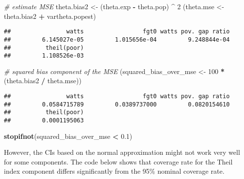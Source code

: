 \documentclass[
]{book}
\newenvironment{Shaded}{\begin{snugshade}}{\end{snugshade}}
\newcommand{\CommentTok}[1]{\textcolor[rgb]{0.56,0.35,0.01}{\textit{#1}}}
\newcommand{\DecValTok}[1]{\textcolor[rgb]{0.00,0.00,0.81}{#1}}
\newcommand{\FloatTok}[1]{\textcolor[rgb]{0.00,0.00,0.81}{#1}}
\newcommand{\FunctionTok}[1]{\textcolor[rgb]{0.13,0.29,0.53}{\textbf{#1}}}
\newcommand{\NormalTok}[1]{#1}
\newcommand{\OtherTok}[1]{\textcolor[rgb]{0.56,0.35,0.01}{#1}}
\newcommand{\SpecialCharTok}[1]{\textcolor[rgb]{0.81,0.36,0.00}{\textbf{#1}}}
\begin{document}
\begin{Shaded}
\begin{Highlighting}[]
\CommentTok{\# estimate MSE}
\NormalTok{theta.bias2 }\OtherTok{\textless{}{-}}\NormalTok{ (theta.exp }\SpecialCharTok{{-}}\NormalTok{ theta.pop) }\SpecialCharTok{\^{}} \DecValTok{2}
\NormalTok{(theta.mse }\OtherTok{\textless{}{-}}\NormalTok{ theta.bias2 }\SpecialCharTok{+}\NormalTok{ vartheta.popest)}
\end{Highlighting}
\end{Shaded}

\begin{verbatim}
##                watts                 fgt0 watts pov. gap ratio 
##         6.145027e-05         1.015656e-04         9.248844e-04 
##          theil(poor) 
##         1.108526e-03
\end{verbatim}

\begin{Shaded}
\begin{Highlighting}[]
\CommentTok{\# squared bias component of the MSE}
\NormalTok{(squared\_bias\_over\_mse }\OtherTok{\textless{}{-}} \DecValTok{100} \SpecialCharTok{*}\NormalTok{ (theta.bias2 }\SpecialCharTok{/}\NormalTok{ theta.mse))}
\end{Highlighting}
\end{Shaded}

\begin{verbatim}
##                watts                 fgt0 watts pov. gap ratio 
##         0.0584715789         0.0389737000         0.0820154610 
##          theil(poor) 
##         0.0001195063
\end{verbatim}

\begin{Shaded}
\begin{Highlighting}[]
\FunctionTok{stopifnot}\NormalTok{(squared\_bias\_over\_mse }\SpecialCharTok{\textless{}} \FloatTok{0.1}\NormalTok{)}
\end{Highlighting}
\end{Shaded}

However, the CIs based on the normal approximation might not work very well for some components. The code below shows that coverage rate for the Theil index component differs significantly from the 95\% nominal coverage rate.
\end{document}
